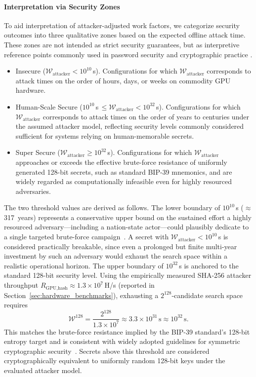 \documentclass[mathematics,article,accept,pdftex,moreauthors]{Definitions/mdpi}
\begin{document}
\paragraph*{Interpretation via Security Zones}
To aid interpretation of attacker-adjusted work factors, we categorize security outcomes into three qualitative zones based on the expected offline attack time. These zones are not intended as strict security guarantees, but as interpretive reference points commonly used in password security and cryptographic practice \cite{Bonneau2012a}.
\begin{itemize}
\item Insecure ($\mathcal{W}_{\text{attacker}} < 10^{10}$\,s). Configurations for which $\mathcal{W}_{\text{attacker}}$ corresponds to attack times on the order of hours, days, or weeks on commodity GPU hardware.
\item Human-Scale Secure ($10^{10}$\,s\,$\le \mathcal{W}_{\text{attacker}} < 10^{32}$\,s). Configurations for which $\mathcal{W}_{\text{attacker}}$ corresponds to attack times on the order of years to centuries under the assumed attacker model, reflecting security levels commonly considered sufficient for systems relying on human-memorable secrets.
\item Super Secure ($\mathcal{W}_{\text{attacker}} \ge 10^{32}$\,s). Configurations for which $\mathcal{W}_{\text{attacker}}$ approaches or exceeds the effective brute-force resistance of uniformly generated 128-bit secrets, such as standard BIP-39 mnemonics, and are widely regarded as computationally infeasible even for highly resourced adversaries.
\end{itemize}

{The two threshold values are derived as follows. The lower boundary of $10^{10}$\,s ($\approx$317~years) represents a conservative upper bound on the sustained effort a highly resourced adversary---including a nation-state actor---could plausibly dedicate to a single targeted brute-force campaign~\cite{Bonneau2012a}. A secret with $\mathcal{W}_{\text{attacker}} < 10^{10}$\,s is considered practically breakable, since even a prolonged but finite multi-year investment by such an adversary would exhaust the search space within a realistic operational horizon. The upper boundary of $10^{32}$\,s is anchored to the standard 128-bit security level. Using the empirically measured SHA-256 attacker throughput $R_{\text{GPU,hash}} \approx 1.3 \times 10^{7}$\,H/s (reported in Section~\ref{sec:hardware_benchmarks}), exhausting a $2^{128}$-candidate search space requires
\begin{equation}
\mathcal{W}^{128} = \frac{2^{128}}{1.3 \times 10^{7}} \approx 3.3 \times 10^{31}\,\text{s} \approx 10^{32}\,\text{s}.
\label{eq:w128_threshold}
\end{equation}
This matches the brute-force resistance implied by the BIP-39 standard's 128-bit entropy target and is consistent with widely adopted guidelines for symmetric cryptographic security~\cite{Bonneau2012a}. Secrets above this threshold are considered cryptographically equivalent to uniformly random 128-bit keys under the evaluated attacker model.}
\end{document}
